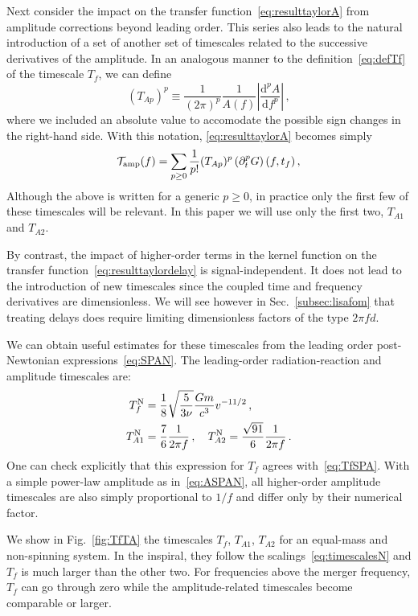 \documentclass[aps,showpacs,twocolumn,
prd,superscriptaddress,nofootinbib]{revtex4-1}
\newcommand{\be}{\begin{equation}}
\newcommand{\ee}{\end{equation}}
\newcommand\ud{{\mathrm{d}}}
\newcommand\calT{{\mathcal{T}}}
\newcommand{\tf}{t_{f}}
\newcommand{\Tf}{T_{f}}
\newcommand{\jgb}[1]{{\color{DarkGreen} #1}}
\begin{document}
\jgb{Next consider the impact on the transfer function~\eqref{eq:resulttaylorA} from amplitude corrections beyond leading order.}  This series also leads to the natural introduction of a set of another set of timescales related to the successive derivatives of the amplitude. In an analogous manner to the definition~\eqref{eq:defTf} of the timescale $\Tf$, we can define
\be\label{eq:defTA}
	\left( T_{Ap} \right)^{p} \equiv \frac{1}{(2 \pi)^{p}} \frac{1}{A(f)} \left| \frac{\ud^{p} A}{\ud f^{p}} \right| \,,
\ee
where we included an absolute value to accomodate the possible sign changes in the right-hand side. With this notation, \eqref{eq:resulttaylorA} becomes simply
\be\label{eq:resultATA}
	\calT_{\rm amp}(f) = \sum\limits_{p\geq 0} \frac{1}{p!} (T_{Ap})^{p}  \left( \partial_{t}^{p} G \right) (f,\tf) \,,
\ee
Although the above is written for a generic $p\geq 0$, in practice only the first few of these timescales will be relevant. In this paper we will use only the first two, $T_{A1}$ and $T_{A2}$.

\jgb{By contrast, the impact of higher-order terms in the kernel function on the transfer function}~\eqref{eq:resulttaylordelay} is signal-independent. It does not lead to the introduction of new timescales since the coupled time and frequency derivatives are dimensionless. We will see however in Sec.~\ref{subsec:lisafom} that treating delays \jgb{does require limiting} dimensionless factors of the type $2\pi f d$.

We can obtain useful estimates for these timescales from the leading order post-Newtonian expressions~\eqref{eq:SPAN}. The leading-order radiation-reaction and amplitude timescales are:
\begin{subequations}\label{eq:timescalesN}
\begin{align}
	\Tf^{\rm N} &= \frac{1}{8} \sqrt{\frac{5}{3\nu}} \frac{G m}{c^{3}} v^{-11/2} \,, \label{eq:TfN}\\
	T_{A1}^{\rm N} &= \frac{7}{6} \frac{1}{2\pi f}\,, \quad T_{A2}^{\rm N} = \frac{\sqrt{91}}{6} \frac{1}{2\pi f} \,. \label{eq:TA1N-TA2N}
\end{align}
\end{subequations}
One can check explicitly that this expression for $\Tf$ agrees with~\eqref{eq:TfSPA}. With a simple power-law amplitude as in~\eqref{eq:ASPAN}, all higher-order amplitude timescales are also simply proportional to $1/f$ and differ only by their numerical factor.

We show in Fig.~\ref{fig:TfTA} the timescales $\Tf$, $T_{A1}$, $T_{A2}$ for an equal-mass and non-spinning system. In the inspiral, they follow the scalings~\eqref{eq:timescalesN} and $\Tf$ is much larger than the other two. For frequencies above the merger frequency, $\Tf$ can go through zero while the amplitude-related timescales become comparable or larger.
\end{document}
